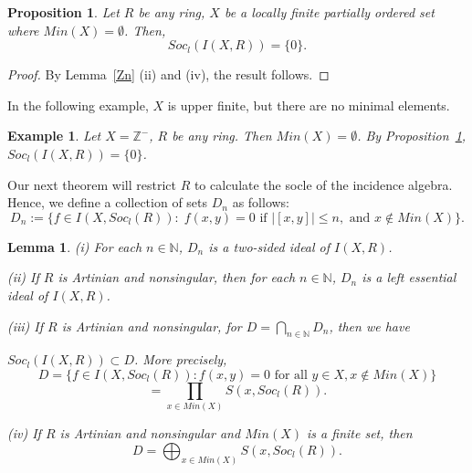 \documentclass[12pt]{article}
\newtheorem{example}[theorem]{Example}
\newtheorem{lemma}[theorem]{Lemma}
\newtheorem{proposition}[theorem]{Proposition}
\begin{document}
\begin{proposition}
	\label{EmptyMin} Let $R$ be any ring, $X$ be a locally finite partially
	ordered set where $Min(X)=\emptyset $. Then, 
	\begin{equation*}
	Soc_{l}({I(X,R)})=\{0\}.
	\end{equation*}
\end{proposition}
\begin{proof}
	By Lemma~\ref{Zn} (ii) and (iv), the result follows.
\end{proof}

In the following example, $X$ is upper finite, but there are no minimal
elements.
\begin{example}
	Let $X=\mathbb{Z}^-$, $R$ be any ring. Then $Min(X) = \emptyset$. By
	Proposition~\ref{EmptyMin}, $Soc_l({I(X,R)}) = \{ 0\}$.
\end{example}
Our next theorem will restrict $R$ to calculate the socle of the incidence algebra. Hence, we define a collection of sets $D_n$ as follows: 
\begin{equation*}
D_n := \{ f \in I(X,Soc_l(R)): \; f(x,y)=0 \mbox{ if } |[x,y]| \leq n, %
\mbox{ and } x \not \in Min(X)\}.
\end{equation*}

\begin{lemma}\label{Dn}
		\textrm{(i)} For each $n\in \mathbb{N}$, $D_{n}$ is a two-sided ideal of ${I(X,R)}$.
		
		\textrm{(ii)} If $R$ is Artinian and nonsingular, then for each $n\in \mathbb{N}$, $D_{n}$ is a left essential ideal of ${I(X,R)}$.
		
		\textrm{(iii)} If $R$ is Artinian and nonsingular, for $D=\bigcap_{n\in \mathbb{N}}D_{n}$, then we have 
		
		$Soc_{l}({I(X,R)})\subset D$. More precisely, 
		\begin{equation*}
		D=\{f\in {I(X,Soc_{l}(R))}:f(x,y)=0
		\mbox{ for
			all }y\in X,x\not\in Min(X)\}
		\end{equation*}
		\begin{equation*}		
			=\prod_{x\in Min(X)}S(x,Soc_{l}(R)).
		\end{equation*}
		
		\textrm{(iv)} If $R$ is Artinian and nonsingular and $Min(X)$ is a finite set, then 
		$$D=\bigoplus_{x\in
			Min(X)}S(x,Soc_{l}(R)).$$
	\end{lemma}
\end{document}

